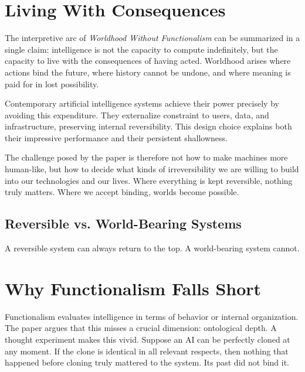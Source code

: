 \documentclass[11pt]{article}
\begin{document}
\section{Living With Consequences}

The interpretive arc of \textit{Worldhood Without Functionalism} can be summarized in a single claim: intelligence is not the capacity to compute indefinitely, but the capacity to live with the consequences of having acted. Worldhood arises where actions bind the future, where history cannot be undone, and where meaning is paid for in lost possibility.

Contemporary artificial intelligence systems achieve their power precisely by avoiding this expenditure. They externalize constraint to users, data, and infrastructure, preserving internal reversibility. This design choice explains both their impressive performance and their persistent shallowness.

The challenge posed by the paper is therefore not how to make machines more human-like, but how to decide what kinds of irreversibility we are willing to build into our technologies and our lives. Where everything is kept reversible, nothing truly matters. Where we accept binding, worlds become possible.


\subsection*{Reversible vs. World-Bearing Systems}

\begin{center}
\end{center}

A reversible system can always return to the top. A world-bearing system cannot.

\section{Why Functionalism Falls Short}

Functionalism evaluates intelligence in terms of behavior or internal organization. The paper argues that this misses a crucial dimension: ontological depth. A thought experiment makes this vivid. Suppose an AI can be perfectly cloned at any moment. If the clone is identical in all relevant respects, then nothing that happened before cloning truly mattered to the system. Its past did not bind it.
\end{document}
